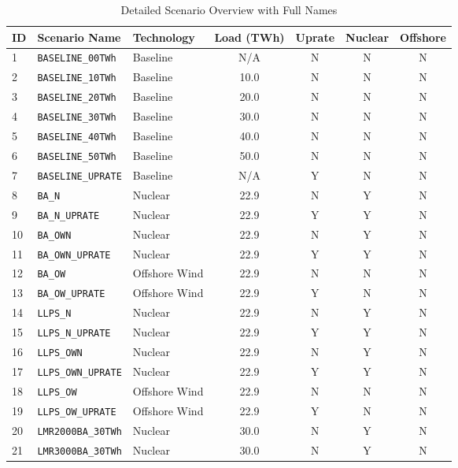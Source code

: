 \begin{landscape}
\begin{table}[htbp]
\centering
\caption{Detailed Scenario Overview with Full Names}
\label{tab:scenario_overview_detailed}
\tiny
\begin{tabular}{lp{8cm}lcccc}
\hline
\textbf{ID} & \textbf{Scenario Name} & \textbf{Technology} & \textbf{Load (TWh)} & \textbf{Uprate} & \textbf{Nuclear} & \textbf{Offshore} \\
\hline
1 & \texttt{BASELINE\_00TWh} & Baseline & N/A & N & N & N \\
2 & \texttt{BASELINE\_10TWh} & Baseline & 10.0 & N & N & N \\
3 & \texttt{BASELINE\_20TWh} & Baseline & 20.0 & N & N & N \\
4 & \texttt{BASELINE\_30TWh} & Baseline & 30.0 & N & N & N \\
5 & \texttt{BASELINE\_40TWh} & Baseline & 40.0 & N & N & N \\
6 & \texttt{BASELINE\_50TWh} & Baseline & 50.0 & N & N & N \\
7 & \texttt{BASELINE\_UPRATE} & Baseline & N/A & Y & N & N \\
8 & \texttt{BA\_N} & Nuclear & 22.9 & N & Y & N \\
9 & \texttt{BA\_N\_UPRATE} & Nuclear & 22.9 & Y & Y & N \\
10 & \texttt{BA\_OWN} & Nuclear & 22.9 & N & Y & N \\
11 & \texttt{BA\_OWN\_UPRATE} & Nuclear & 22.9 & Y & Y & N \\
12 & \texttt{BA\_OW} & Offshore Wind & 22.9 & N & N & N \\
13 & \texttt{BA\_OW\_UPRATE} & Offshore Wind & 22.9 & Y & N & N \\
14 & \texttt{LLPS\_N} & Nuclear & 22.9 & N & Y & N \\
15 & \texttt{LLPS\_N\_UPRATE} & Nuclear & 22.9 & Y & Y & N \\
16 & \texttt{LLPS\_OWN} & Nuclear & 22.9 & N & Y & N \\
17 & \texttt{LLPS\_OWN\_UPRATE} & Nuclear & 22.9 & Y & Y & N \\
18 & \texttt{LLPS\_OW} & Offshore Wind & 22.9 & N & N & N \\
19 & \texttt{LLPS\_OW\_UPRATE} & Offshore Wind & 22.9 & Y & N & N \\
20 & \texttt{LMR2000BA\_30TWh} & Nuclear & 30.0 & N & Y & N \\
21 & \texttt{LMR3000BA\_30TWh} & Nuclear & 30.0 & N & Y & N \\

\end{tabular}
\end{table}
\end{landscape}
